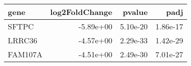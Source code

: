 \begin{tabular}{lrrr}
\toprule
   gene &  log2FoldChange &   pvalue &     padj \\
\midrule
  SFTPC &       -5.89e+00 & 5.10e-20 & 1.86e-17 \\
 LRRC36 &       -4.57e+00 & 2.29e-33 & 1.42e-29 \\
FAM107A &       -4.51e+00 & 2.49e-30 & 7.01e-27 \\
\bottomrule
\end{tabular}
